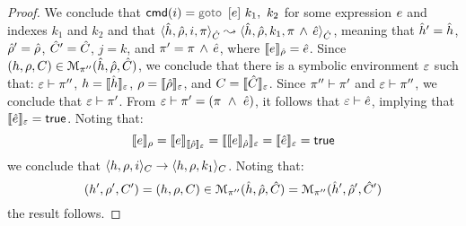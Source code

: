 \begin{proof}
\noindent{} 
We conclude that $\ccmd{i} = \ifgoto{\jsilexpr}{k_1}{k_2}$ for some expression 
$\jsilexpr$ and indexes $k_1$ and $k_2$ and 
that $\symbtrans{\sheap, \sstore, i, \pc}{\sheap, \sstore, k_1, \pc \, \wedge \, \sexpr}[\sctx][\sctx]$, 
meaning that $\sheap' = \sheap$, $\sstore' = \sstore$, $\sctx' = \sctx$, $j = k$, 
and $\pc' = \pc \, \wedge \, \sexpr$, where $\semexpr{\jsilexpr}{\sstore} = \sexpr$. 
Since $(\heap, \store, \ctx) \in \smodels{\sheap, \sstore, \sctx}{\pc''}$, we conclude that 
there is a symbolic environment $\senv$ such that: $\senv \vdash \pc''$, 
$\heap = \semexpr{\sheap}{\senv}$, $\store = \semexpr{\sstore}{\senv}$, 
and $\ctx = \semexpr{\sctx}{\senv}$.
Since $\pc'' \vdash \pc'$ and $\senv \vdash \pc''$, we conclude that $\senv \vdash \pc'$. 
From  $\senv \vdash \pc' = (\pc \ \wedge \ \sexpr)$, it follows that $\senv \vdash \sexpr$, 
implying that $\symbeval{\sexpr}{\senv} = \jtrue$. 
Noting that: 
$$
\semexpr{\jsilexpr}{\store} = \semexpr{\jsilexpr}{\semexpr{\sstore}{\senv}} 
    = \semexpr{\semexpr{\jsilexpr}{\sstore}}{\senv} 
    = \semexpr{\sexpr}{\senv}
    = \jtrue
$$
we conclude that $\semtrans{\heap, \store, i}{\heap, \store, k_1}[\ctx][\ctx]$. 
Noting that: 
$$
(\heap', \store', \ctx') = (\heap, \store, \ctx) \in \smodels{\sheap, \sstore, \sctx}{\pc''}  = \smodels{\sheap', \sstore', \sctx'}{\pc''}
$$
the result follows. 
\vspace{6pt}



\end{proof}
